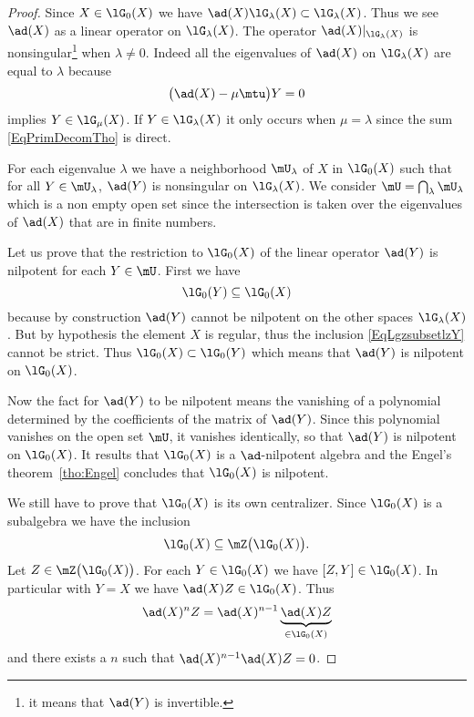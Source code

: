 \begin{proof}
    Since \( X\in\lG_0(X)\) we have \( \ad(X)\lG_{\lambda}(X)\subset\lG_{\lambda}(X)\). Thus we see \( \ad(X)\) as a linear operator on \( \lG_{\lambda}(X)\). The operator \( \ad(X)|_{\lG_{\lambda}(X)}\) is nonsingular\footnote{it means that \( \ad(Y)\) is invertible.} when \( \lambda\neq 0\). Indeed all the eigenvalues of \( \ad(X)\) on \( \lG_{\lambda}(X)\) are equal to \( \lambda\) because
    \begin{equation}
        \big( \ad(X)-\mu\mtu \big)Y=0
    \end{equation}
    implies \( Y\in\lG_{\mu}(X)\). If \( Y\in\lG_{\lambda}(X)\) it only occurs when \( \mu=\lambda\) since the sum \eqref{EqPrimDecomTho} is direct.

    For each eigenvalue \( \lambda\) we have a neighborhood \( \mU_{\lambda}\) of $X$ in \( \lG_0(X)\) such that for all \( Y\in\mU_{\lambda}\), \( \ad(Y)\) is nonsingular on \( \lG_{\lambda}(X)\). We consider \( \mU=\bigcap_{\lambda}\mU_{\lambda}\) which is a non empty open set since the intersection is taken over the eigenvalues of \( \ad(X)\) that are in finite numbers.

    Let us prove that the restriction to \( \lG_0(X)\) of the linear operator \( \ad(Y)\) is nilpotent for each \( Y\in\mU\). First we have
    \begin{equation}        \label{EqLgzsubsetlzY}
        \lG_0(Y)\subseteq\lG_0(X)
    \end{equation}
    because by construction \( \ad(Y)\) cannot be nilpotent on the other spaces \( \lG_{\lambda}(X)\). But by hypothesis the element \( X\) is regular, thus the inclusion \eqref{EqLgzsubsetlzY} cannot be strict. Thus \( \lG_0(X)\subset\lG_0(Y)\) which means that \( \ad(Y)\) is nilpotent on \( \lG_0(X)\).

    Now the fact for \( \ad(Y)\) to be nilpotent means the vanishing of a polynomial determined by the coefficients of the matrix of \( \ad(Y)\). Since this polynomial vanishes on the open set \( \mU\), it vanishes identically, so that \( \ad(Y)\) is nilpotent on \( \lG_0(X)\). It results that \( \lG_0(X)\) is a \( \ad\)-nilpotent algebra and the Engel's theorem~\ref{tho:Engel} concludes that \( \lG_0(X)\) is nilpotent.

    We still have to prove that \( \lG_0(X)\) is its own centralizer. Since \( \lG_0(X)\) is a subalgebra we have the inclusion
    \begin{equation}
        \lG_0(X)\subseteq\mZ\big( \lG_0(X) \big).
    \end{equation}
    Let \( Z\in\mZ\big( \lG_0(X) \big)\). For each \( Y\in\lG_0(X)\) we have \( [Z,Y]\in\lG_0(X)\). In particular with \( Y=X\) we have \( \ad(X)Z\in\lG_0(X)\). Thus
    \begin{equation}
        \ad(X)^nZ=\ad(X)^{n-1}\underbrace{\ad(X)Z}_{\in\lG_0(X)}
    \end{equation}
    and there exists a \( n\) such that \( \ad(X)^{n-1}\ad(X)Z=0\).
\end{proof}

